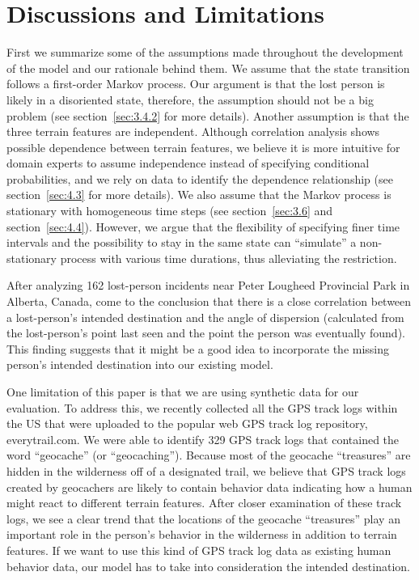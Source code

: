 \documentclass[smallextended,natbib]{svjour3}
\begin{document}
\section{Discussions and Limitations}
\label{sec:5}

First we summarize some of the assumptions made throughout the development of the model and our rationale behind them. We assume that the state transition follows a first-order Markov process. Our argument is that the lost person is likely in a disoriented state, therefore, the assumption should not be a big problem (see section~\ref{sec:3.4.2} for more details). Another assumption is that the three terrain features are independent. Although correlation analysis shows possible dependence between terrain features, we believe it is more intuitive for domain experts to assume independence instead of specifying conditional probabilities, and we rely on data to identify the dependence relationship (see section~\ref{sec:4.3} for more details). We also assume that the Markov process is stationary with homogeneous time steps (see section~\ref{sec:3.6} and section~\ref{sec:4.4}). However, we argue that the flexibility of specifying finer time intervals and the possibility to stay in the same state can ``simulate'' a non-stationary process with various time durations, thus alleviating the restriction.

After analyzing 162 lost-person incidents near Peter Lougheed Provincial Park in Alberta, Canada, \cite{CanadaSAR} come to the conclusion that there is a close correlation between a lost-person's intended destination and the angle of dispersion (calculated from the lost-person's point last seen and the point the person was eventually found). This finding suggests that it might be a good idea to incorporate the missing person's intended destination into our existing model.

One limitation of this paper is that we are using synthetic data for our evaluation. To address this, we recently collected all the GPS track logs within the US that were uploaded to the popular web GPS track log repository, everytrail.com. We were able to identify 329 GPS track logs that contained the word ``geocache'' (or ``geocaching''). Because most of the geocache ``treasures'' are hidden in the wilderness off of a designated trail, we believe that GPS track logs created by geocachers are likely to contain behavior data indicating how a human might react to different terrain features. After closer examination of these track logs, we see a clear trend that the locations of the geocache ``treasures'' play an important role in the person's behavior in the wilderness in addition to terrain features. If we want to use this kind of GPS track log data as existing human behavior data, our model has to take into consideration the intended destination.
\end{document}
